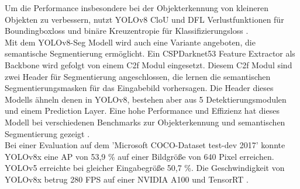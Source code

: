 {{	Um die Performance insbesondere bei der Objekterkennung von kleineren Objekten zu verbessern, nutzt YOLOv8 CloU \citep{Zheng2020} und DFL \citep{Li2020} Verlustfunktionen für Boundingboxloss und binäre Kreuzentropie für Klassifizierungsloss \citep{Terven2023}. \\

	Mit dem YOLOv8-Seg Modell wird auch eine Variante angeboten, die semantische Segmentierung ermöglicht. Ein CSPDarknet53 Feature Extractor als Backbone wird gefolgt von einem C2f Modul eingesetzt. Diesem C2f Modul sind zwei Header für Segmentierung angeschlossen, die lernen die semantischen Segmentierungsmasken für das Eingabebild vorhersagen. Die Header dieses Modells ähneln denen in  YOLOv8, bestehen aber aus 5 Detektierungsmodulen und einem Prediction Layer. Eine hohe Performance und Effizienz hat dieses Modell bei verschiedenen Benchmarks zur Objekterkennung und semantischen Segmentierung gezeigt \citep{Terven2023}. \\
	Bei einer Evaluation auf dem 'Microsoft COCO-Dataset test-dev 2017' konnte YOLOv8x eine AP von 53,9 \% auf einer Bildgröße von 640 Pixel erreichen. YOLOv5 erreichte bei gleicher Eingabegröße 50,7 \%. Die Geschwindigkeit von YOLOv8x betrug 280 FPS auf einer NVIDIA A100 und TensorRT \citep{Terven2023}.
	}
}

\clearpage


